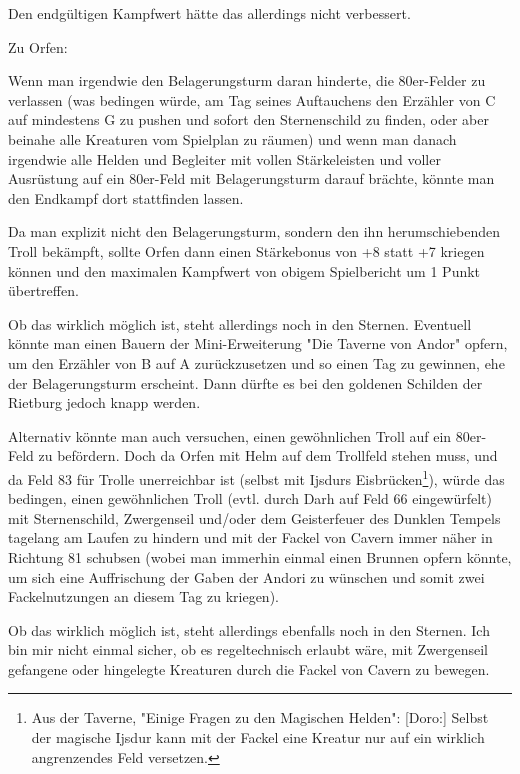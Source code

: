 \documentclass[10pt, a4paper, oneside]{book}
\begin{document}
{Den endgültigen Kampfwert hätte das allerdings nicht verbessert.\bigskip







Zu Orfen:



Wenn man irgendwie den Belagerungsturm daran hinderte, die 80er-Felder zu verlassen (was bedingen würde, am Tag seines Auftauchens den Erzähler von C auf mindestens G zu pushen und sofort den Sternenschild zu finden, oder aber beinahe alle Kreaturen vom Spielplan zu räumen) und wenn man danach irgendwie alle Helden und Begleiter mit vollen Stärkeleisten und voller Ausrüstung auf ein 80er-Feld mit Belagerungsturm darauf brächte, könnte man den Endkampf dort stattfinden lassen.

Da man explizit nicht den Belagerungsturm, sondern den ihn herumschiebenden Troll bekämpft, sollte Orfen dann einen Stärkebonus von +8 statt +7 kriegen können und den maximalen Kampfwert von obigem Spielbericht um 1 Punkt übertreffen.

Ob das wirklich möglich ist, steht allerdings noch in den Sternen. Eventuell könnte man einen Bauern der Mini-Erweiterung "Die Taverne von Andor" opfern, um den Erzähler von B auf A zurückzusetzen und so einen Tag zu gewinnen, ehe der Belagerungsturm erscheint. Dann dürfte es bei den goldenen Schilden der Rietburg jedoch knapp werden.



Alternativ könnte man auch versuchen, einen gewöhnlichen Troll auf ein 80er-Feld zu befördern. Doch da Orfen mit Helm auf dem Trollfeld stehen muss, und da Feld 83 für Trolle unerreichbar ist (selbst mit Ijsdurs Eisbrücken\footnote{Aus der Taverne, "Einige Fragen zu den Magischen Helden": [Doro:] Selbst der magische Ijsdur kann mit der Fackel eine Kreatur nur auf ein wirklich angrenzendes Feld versetzen. }), würde das bedingen, einen gewöhnlichen Troll (evtl. durch Darh auf Feld 66 eingewürfelt) mit Sternenschild, Zwergenseil und/oder dem Geisterfeuer des Dunklen Tempels tagelang am Laufen zu hindern und mit der Fackel von Cavern immer näher in Richtung 81 schubsen (wobei man immerhin einmal einen Brunnen opfern könnte, um sich eine Auffrischung der Gaben der Andori zu wünschen und somit zwei Fackelnutzungen an diesem Tag zu kriegen).

Ob das wirklich möglich ist, steht allerdings ebenfalls noch in den Sternen. Ich bin mir nicht einmal sicher, ob es regeltechnisch erlaubt wäre, mit Zwergenseil gefangene oder hingelegte Kreaturen durch die Fackel von Cavern zu bewegen.\bigskip







}
\end{document}
